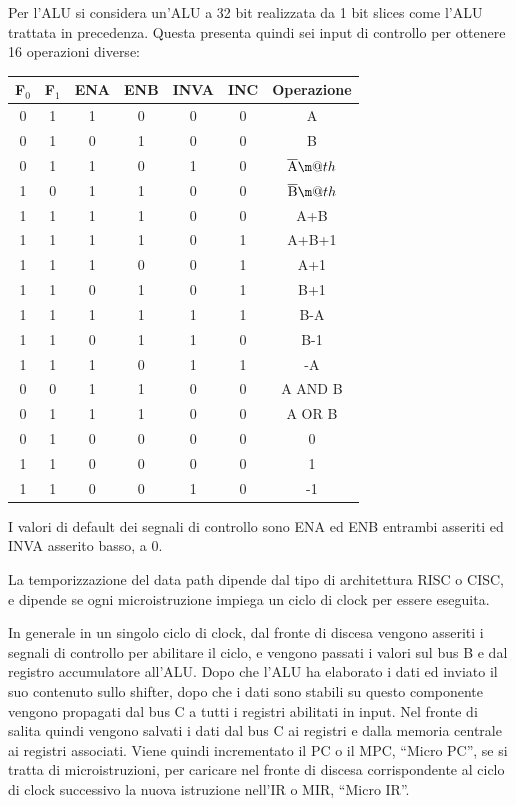 \documentclass{article}
\makeatletter
\newcommand*{\textoverline}[1]{$\overline{\hbox{#1}}\m@th$}
\numberwithin{equation}{subsection}
\makeatother
\begin{document}
Per l'ALU si considera un'ALU a 32 bit realizzata da 1 bit slices come l'ALU trattata in precedenza. Questa presenta quindi sei input di controllo per ottenere 16 operazioni diverse: 
\begin{center}
    \begin{tabular}{|c|c|c|c|c|c||c|}
        \hline
        F$_0$&F$_1$&ENA&ENB&INVA&INC&Operazione\\
        \hline\hline
        0&1&1&0&0&0&A\\
        \hline
        0&1&0&1&0&0&B\\
        \hline
        0&1&1&0&1&0&\textoverline{A}\\
        \hline
        1&0&1&1&0&0&\textoverline{B}\\
        \hline
        1&1&1&1&0&0&A+B\\
        \hline
        1&1&1&1&0&1&A+B+1\\
        \hline
        1&1&1&0&0&1&A+1\\
        \hline
        1&1&0&1&0&1&B+1\\
        \hline
        1&1&1&1&1&1&B-A\\
        \hline
        1&1&0&1&1&0&B-1\\
        \hline
        1&1&1&0&1&1&-A\\
        \hline
        0&0&1&1&0&0&A AND B\\
        \hline
        0&1&1&1&0&0&A OR B\\
        \hline
        0&1&0&0&0&0&0\\
        \hline
        1&1&0&0&0&0&1\\
        \hline
        1&1&0&0&1&0&-1\\
        \hline        
    \end{tabular}
\end{center}

I valori di default dei segnali di controllo sono ENA ed ENB entrambi asseriti ed INVA asserito basso, a 0. 

La temporizzazione del data path dipende dal tipo di architettura RISC o CISC, e dipende se ogni microistruzione impiega un ciclo di clock per essere eseguita. 

In generale in un singolo ciclo di clock, dal fronte di discesa vengono asseriti i segnali di controllo per abilitare il ciclo, e vengono passati i valori sul bus B e dal registro accumulatore all'ALU. 
Dopo che l'ALU ha elaborato i dati ed inviato il suo contenuto sullo shifter, dopo che i dati sono stabili su questo componente vengono propagati dal bus C a tutti i registri abilitati in 
input. Nel fronte di salita quindi vengono salvati i dati dal bus C ai registri e dalla memoria centrale ai registri associati. Viene quindi incrementato il PC o il MPC, ``Micro PC'', se 
si tratta di microistruzioni, per caricare nel fronte di discesa corrispondente al ciclo di clock successivo la nuova istruzione nell'IR o MIR, ``Micro IR''. 
\end{document}
